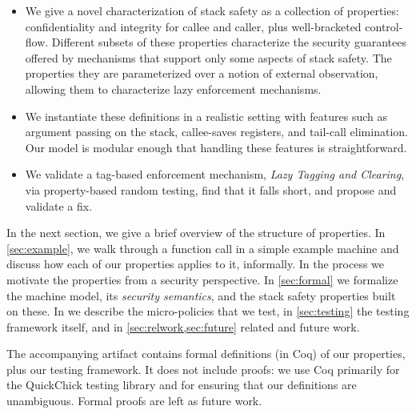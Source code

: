 \documentclass[10pt,conference]{ieeetran}%
\theoremstyle{definition}
\begin{document}
\begin{itemize}
\item We give a novel characterization of stack safety as a collection
of properties: confidentiality and integrity for callee and caller,
plus well-bracketed control-flow. Different subsets of these
properties characterize the security guarantees offered by mechanisms
that support only some aspects of stack safety. 
The properties they are parameterized over a notion of
external observation, allowing them to characterize lazy enforcement
mechanisms.
\item We instantiate these definitions in a realistic
setting with features such as
argument passing on the stack, callee-saves registers, and tail-call
elimination.  Our model is
modular enough that handling these features is straightforward.
\item We validate a tag-based enforcement mechanism, \emph{Lazy
  Tagging and Clearing}, via property-based random testing, find that
it falls short, and propose and validate a fix.
\end{itemize}

In the next section, we give a brief overview of the structure of
properties.  In \cref{sec:example}, we walk through a function call in
a simple example machine and discuss how each of our properties
applies to it, informally. In the process we motivate the properties
from a security perspective.
%
In \cref{sec:formal} we formalize the machine model,
its {\em security semantics}, and the stack safety properties built on these.
In  we describe the micro-policies that we test,
in \cref{sec:testing} the testing framework itself, and in
\cref{sec:relwork,sec:future} related and future work.

The accompanying artifact contains formal definitions (in Coq) of our
properties, plus our testing framework.  It does not include proofs:
we use Coq primarily for the QuickChick testing library and for
ensuring that our definitions are unambiguous.  Formal proofs are left
as future work.
\end{document}
